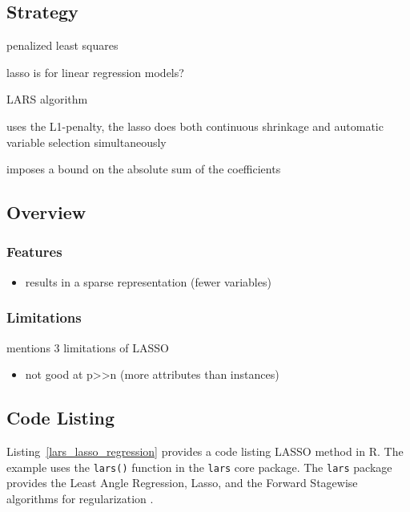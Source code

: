 \subsection{Strategy}

penalized least squares

lasso is for linear regression models?

LARS algorithm

uses the L1-penalty, the lasso does both continuous shrinkage and automatic variable selection simultaneously

imposes a bound on the absolute sum of the coefficients

\subsection{Overview}

\subsubsection{Features}

\begin{itemize}
	\item results in a sparse representation (fewer variables)
\end{itemize}

\subsubsection{Limitations}

\cite{Zou2005} mentions 3 limitations of LASSO

\begin{itemize}
	\item not good at p>>n (more attributes than instances)
\end{itemize}


\subsection{Code Listing}
Listing~\ref{lars_lasso_regression} provides a code listing LASSO method in R.
The example uses the \texttt{lars()} function in the \texttt{lars} core package. The \texttt{lars} package provides the Least Angle Regression, Lasso, and the Forward Stagewise algorithms for regularization \cite{Hastie2011}.

